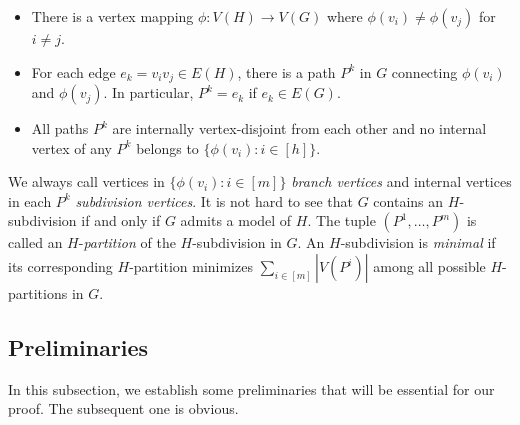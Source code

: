 \documentclass[11pt, a4paper]{article}
\theoremstyle{definition}
\newcommand{\<}{\subseteq}
\newcommand{\red}[1]{\textcolor[rgb]{1.00,0.00,0.00}{#1}}
\begin{document}
\begin{itemize}
    \item There is a vertex mapping $\phi: V(H) \to V(G)$ where $\phi(v_i) \neq \phi(v_j)$ for $i \neq j$. 
    \item For each edge $e_k = v_iv_j \in E(H)$, there is a path $P^k$ in $G$ connecting $\phi(v_i)$ and $\phi(v_j)$. In particular, $P^k=e_k$ if $e_k \in E(G)$.
    \item All paths ${P^k}$ are internally vertex-disjoint from each other and no internal vertex of any $P^k$
  belongs to $\{\phi(v_i):i\in [h]\}$. 
\end{itemize}
We always call vertices in $\{\phi(v_i):i\in [m]\}$ {\textit{branch vertices}} and internal vertices in each $P^k$ \textit{subdivision vertices}. 
It is not hard to see that $G$  contains an $H$-subdivision if and only if $G$ admits a model of $H$. %
The tuple $(P^1,\ldots,P^m)$ is called an 
$H$-\textit{partition} of the $H$-subdivision in $G$. %
An $H$-subdivision is \textit{minimal} if its corresponding $H$-partition minimizes $\sum_{i\in [m]}|V(P^i)|$ among all possible $H$-partitions in $G$. %



\subsection{Preliminaries}


In this subsection, we establish some preliminaries that will be essential for our proof. %
The subsequent one is obvious.
\end{document}
